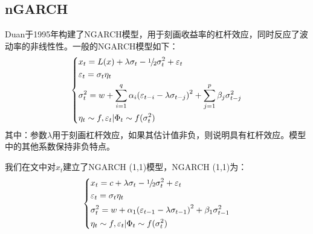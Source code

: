     \subsection{nGARCH}
        Duan于1995年构建了NGARCH模型，用于刻画收益率的杠杆效应，同时反应了波动率的非线性性。一般的NGARCH模型如下：
        \begin{equation*}
        \centering
        \left\{\begin{lgathered}
        {x_t} = L(x) + \lambda {\sigma _t} - {\raise0.5ex\hbox{$\scriptstyle 1$}
        \kern-0.1em/\kern-0.15em
        \lower0.25ex\hbox{$\scriptstyle 2$}}\sigma _t^2 + {\varepsilon _t}\\
        {\varepsilon _t} = {\sigma _t}{\eta _t}\\
        \sigma _t^2 = w + \sum\limits_{i = 1}^q {{\alpha _i}{{\left( {{\varepsilon _{t - i}} - \lambda {\sigma _{t - j}}} \right)}^2}}  + \sum\limits_{j = 1}^p {{\beta _j}\sigma _{t - j}^2} \\
        {\eta _t} \sim f,{\varepsilon _t}|{\Phi _t} \sim f(\sigma _t^2)
         \end{lgathered} \right.
         \end{equation*}
        其中：参数$\lambda$用于刻画杠杆效应，如果其估计值非负，则说明具有杠杆效应。模型中的其他系数保持非负特点。
        \par
        我们在文中对$x_t$建立了NGARCH (1,1)模型，NGARCH (1,1)为：
        \begin{equation*}
        \centering
        \left\{\begin{lgathered}
        {x_t} = c + \lambda {\sigma _t} - {\raise0.5ex\hbox{$\scriptstyle 1$}
        \kern-0.1em/\kern-0.15em
        \lower0.25ex\hbox{$\scriptstyle 2$}}\sigma _t^2 + {\varepsilon _t}\\
        {\varepsilon _t} = {\sigma _t}{\eta _t}\\
        \sigma _t^2 = w + {\alpha _1}{\left( {{\varepsilon _{t - 1}} - \lambda {\sigma _{t - 1}}} \right)^2} + {\beta _1}\sigma _{t - 1}^2\\
        {\eta _t} \sim f,{\varepsilon _t}|{\Phi _t} \sim f(\sigma _t^2)
         \end{lgathered} \right.
         \end{equation*}
